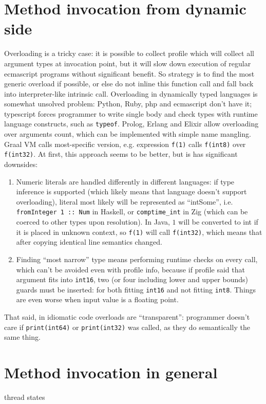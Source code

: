 \documentclass[times, %
               specification,annotation, %
               titlepage-extra-ru,specification-extra-ru,annotation-extra-ru, %
               languages={russian,english} %
              ]{itmo-student-thesis}
\begin{document}
\section{Method invocation from dynamic side}
Overloading is a tricky case: it is possible to collect profile which will collect all argument types at invocation point, but it will slow down execution of regular ecmascript programs without significant benefit. So strategy is to find the most generic overload if possible, or else do not inline this function call and fall back into interpreter-like intrinsic call. Overloading in dynamically typed languages is somewhat unsolved problem: Python, Ruby, php and ecmascript don't have it; typescript forces programmer to write single body and check types with runtime language constructs, such as \texttt{typeof}. Prolog, Erlang and Elixir allow overloading over arguments count, which can be implemented with simple name mangling.\\
Graal VM calls most-specific version, e.g. expression \texttt{f(1)} calls \texttt{f(int8)} over \texttt{f(int32)}. At first, this approach seems to be better, but is has significant downsides:\\
\begin{enumerate}
    \item Numeric literals are handled differently in different languages: if type inference is supported (which likely means that language doesn't support overloading), literal most likely will be represented as ``intSome'', i.e. \texttt{fromInteger 1 :: Num} in Haskell, or \texttt{comptime\_int} in Zig (which can be coerced to other types upon resolution). In Java, $1$ will be converted to int if it is placed in unknown context, so \texttt{f(1)} will call \texttt{f(int32)}, which means that after copying identical line semantics changed.
    \item Finding ``most narrow'' type means performing runtime checks on every call, which can't be avoided even with profile info, because if profile said that argument fits into \texttt{int16}, two (or four including lower and upper bounds) guards must be inserted: for both fitting \texttt{int16} and not fitting \texttt{int8}. Things are even worse when input value is a floating point.
\end{enumerate}
That said, in idiomatic code overloads are ``transparent'': programmer doesn't care if \texttt{print(int64)} or \texttt{print(int32)} was called, as they do semantically the same thing.

\section{Method invocation in general}
\TODO thread states
\end{document}
